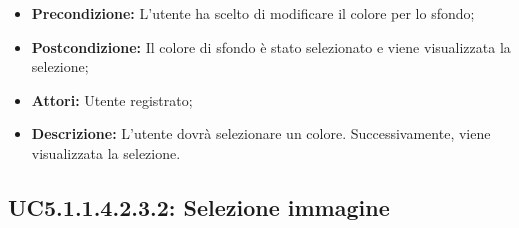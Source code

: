 \begin{itemize}
	\item \textbf{Precondizione:} L'utente ha scelto di modificare il colore per lo sfondo;
	\item \textbf{Postcondizione:} Il colore di sfondo è stato selezionato e viene visualizzata la selezione;
	\item \textbf{Attori:} Utente registrato;
	\item \textbf{Descrizione:} L'utente dovrà selezionare un colore.  Successivamente, viene visualizzata la selezione.
\end{itemize}
\subsection{ UC5.1.1.4.2.3.2: Selezione immagine}

